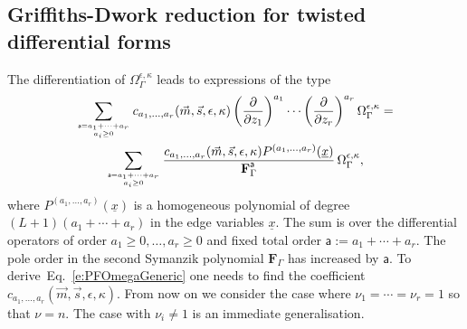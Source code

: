 \documentclass[a4paper,12pt]{article}
\numberwithin{equation}{section}
\numberwithin{figure}{section}
\begin{document}
\subsection{Griffiths-Dwork reduction for twisted differential forms}\label{sec:griff-dwork-reduct}
The    differentiation of $\Omega_\Gamma^{\epsilon,\kappa}$ 
leads  to  expressions of the type 
\begin{multline}\label{e:PDE}
\sum_{\mathsf{a}=a_1+\cdots+a_r\atop
  a_i\geq0}c_{a_1,\dots,a_r}(\vec m,\vec s,\epsilon,\kappa)\left(\partial\over \partial z_1\right)^{a_1}\cdots\left(\partial
  \over\partial z_r\right)^{a_r} \Omega_\Gamma^{\epsilon,\kappa}=\cr \sum_{\mathsf{a}=a_1+\cdots+a_r\atop a_i\geq0}
{ 
  c_{a_1,\dots,a_r}(\vec m,\vec s,\epsilon,\kappa)  P^{(a_1,\dots,a_r)}(\underline x)\over \textbf{F}_\Gamma^{\mathsf {a}}}\, \Omega_\Gamma^{\epsilon,\kappa},
\end{multline}
where 
$  P^{(a_1,\dots,a_r)}(\underline x)$ is a
  homogeneous polynomial of degree $(L+1)(a_1+\cdots+a_r)$ in
  the edge variables $\underline x$.
  The sum is over the differential operators of order
  $a_1\geq0 ,\dots, a_r\geq0$ and fixed total order $\mathsf{a}:=a_1+\cdots +a_r$. 
The
  pole order in the second Symanzik polynomial $\textbf{F}_\Gamma$ has increased by
  $\mathsf a$. 
  To derive~Eq.~\eqref{e:PFOmegaGeneric} one needs to find the
  coefficient $ c_{a_1,\dots,a_r}(\vec m,\vec s,\epsilon,\kappa)$.  From now on we consider the case where
  $\nu_1=\cdots=\nu_r=1$ so that $\nu=n$. The case with $\nu_i\neq1$
  is an immediate generalisation.

  
\end{document}
